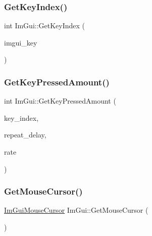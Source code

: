 \mbox{\label{namespace_im_gui_a6cf235f0d0787d51a93f6d90e0bdff9b}} 
\subsubsection{\texorpdfstring{Get\+Key\+Index()}{GetKeyIndex()}}
{\footnotesize\ttfamily int Im\+Gui\+::\+Get\+Key\+Index (\begin{DoxyParamCaption}\item[{\mbox{\hyperlink{imgui_8h_a1671ca739cf1384a8cc268758f27b4e7}{Im\+Gui\+Key}}}]{imgui\+\_\+key }\end{DoxyParamCaption})}

\mbox{\label{namespace_im_gui_ad94a09fc01052f02fe11bec5a3c11275}} 
\subsubsection{\texorpdfstring{Get\+Key\+Pressed\+Amount()}{GetKeyPressedAmount()}}
{\footnotesize\ttfamily int Im\+Gui\+::\+Get\+Key\+Pressed\+Amount (\begin{DoxyParamCaption}\item[{int}]{key\+\_\+index,  }\item[{float}]{repeat\+\_\+delay,  }\item[{float}]{rate }\end{DoxyParamCaption})}

\mbox{\label{namespace_im_gui_a3b955bb840a2411f7c19ac6687d57392}} 
\subsubsection{\texorpdfstring{Get\+Mouse\+Cursor()}{GetMouseCursor()}}
{\footnotesize\ttfamily \mbox{\hyperlink{imgui_8h_a9223d6c82bb5d12c2eab5f829ca520ef}{Im\+Gui\+Mouse\+Cursor}} Im\+Gui\+::\+Get\+Mouse\+Cursor (\begin{DoxyParamCaption}{ }\end{DoxyParamCaption})}

